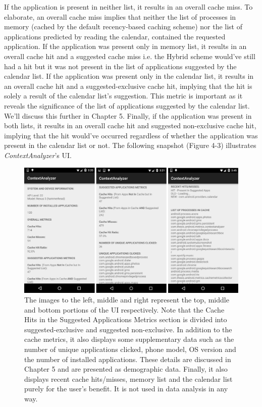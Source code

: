 \documentclass[12pt]{uthesis-v12}  %
\begin{document}
		If the application is present in neither list, it results in an overall cache miss. To elaborate, an overall cache miss implies that neither the list of processes in memory (cached by the default recency-based caching scheme) nor the list of applications predicted by reading the calendar, contained the requested application. If the application was present only in memory list, it results in an overall cache hit and a suggested cache miss i.e. the Hybrid scheme would've still had a hit but it was not present in the list of applications suggested by the calendar list. If the application was present only in the calendar list, it results in an overall cache hit and a suggested-exclusive cache hit, implying that the hit is solely a result of the calendar list's suggestion. This metric is important as it reveals the significance of the list of applications suggested by the calendar list. We'll discuss this further in Chapter 5. Finally, if the application was present in both lists, it results in an overall cache hit and suggested non-exclusive cache hit, implying that the hit would've occurred regardless of whether the application was present in the calendar list or not. The following snapshot (Figure 4-3) illustrates {\em ContextAnalyzer}'s UI.  
		
		\begin{figure}[h]
			\centering
			\includegraphics[width = 130mm]{images/contextAnalyzerUI.png}
			\caption[Context Analyzer UI]{The images to the left, middle and right represent the top, middle and bottom portions of the UI respectively. Note that the Cache Hits in the Suggested Applications Metrics section is divided into suggested-exclusive and suggested non-exclusive. In addition to the cache metrics, it also displays some supplementary data such as the number of unique applications clicked, phone model, OS version and the number of installed applications. These details are discussed in Chapter 5 and are presented as demographic data. Finally, it also displays recent cache hits/misses, memory list and the calendar list purely for the user's benefit. It is not used in data analysis in any way.}
		\end{figure}
		
\end{document}
